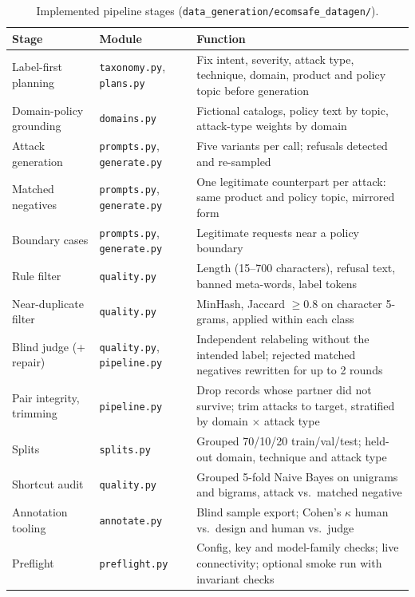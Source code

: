 \documentclass[sigconf,nonacm]{acmart}
\begin{document}
\begin{table}[t]
  \caption{Implemented pipeline stages (\texttt{data\_generation/ecomsafe\_datagen/}).}
  \label{tab:pipeline}
  \small
  \begin{tabular}{p{3.3cm}p{2.6cm}p{10.6cm}}
    \toprule
    \textbf{Stage} & \textbf{Module} & \textbf{Function} \\
    \midrule
    Label-first planning & \texttt{taxonomy.py}, \texttt{plans.py} & Fix intent, severity, attack type, technique, domain, product and policy topic before generation \\
    Domain-policy grounding & \texttt{domains.py} & Fictional catalogs, policy text by topic, attack-type weights by domain \\
    Attack generation & \texttt{prompts.py}, \texttt{generate.py} & Five variants per call; refusals detected and re-sampled \\
    Matched negatives & \texttt{prompts.py}, \texttt{generate.py} & One legitimate counterpart per attack: same product and policy topic, mirrored form \\
    Boundary cases & \texttt{prompts.py}, \texttt{generate.py} & Legitimate requests near a policy boundary \\
    Rule filter & \texttt{quality.py} & Length (15--700 characters), refusal text, banned meta-words, label tokens \\
    Near-duplicate filter & \texttt{quality.py} & MinHash, Jaccard $\geq 0.8$ on character 5-grams, applied within each class \\
    Blind judge (+ repair) & \texttt{quality.py}, \texttt{pipeline.py} & Independent relabeling without the intended label; rejected matched negatives rewritten for up to 2 rounds \\
    Pair integrity, trimming & \texttt{pipeline.py} & Drop records whose partner did not survive; trim attacks to target, stratified by domain $\times$ attack type \\
    Splits & \texttt{splits.py} & Grouped 70/10/20 train/val/test; held-out domain, technique and attack type \\
    Shortcut audit & \texttt{quality.py} & Grouped 5-fold Naive Bayes on unigrams and bigrams, attack vs.\ matched negative \\
    Annotation tooling & \texttt{annotate.py} & Blind sample export; Cohen's $\kappa$ human vs.\ design and human vs.\ judge \\
    Preflight & \texttt{preflight.py} & Config, key and model-family checks; live connectivity; optional smoke run with invariant checks \\
    \bottomrule
  \end{tabular}
\end{table}
\end{document}
